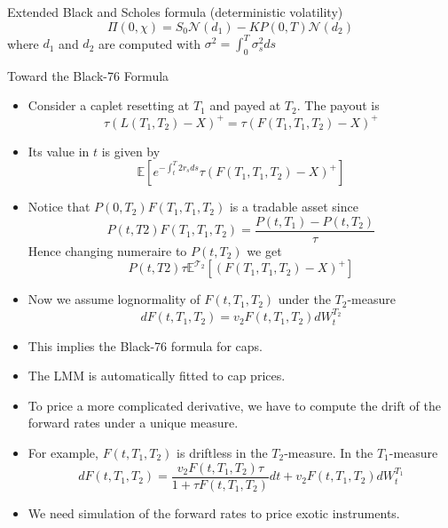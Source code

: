 \documentclass{beamer}
\begin{document}
\begin{frame}
	\begin{block}{Extended Black and Scholes formula (deterministic volatility)}
		\begin{equation}
			\Pi(0,\chi) = S_0\mathcal{N}(d_1) - KP(0,T)\mathcal{N}(d_2)
		\end{equation}
		where $d_1$ and $d_2$ are computed with $\sigma^2 = \int_0^T \sigma_s^2 ds$
	\end{block}
\end{frame}

\begin{frame}{Toward the Black-76 Formula}
	\begin{itemize}
		\item Consider a caplet resetting at $T_1$ and payed at $T_2$. The payout is 
		\begin{equation}
			\tau(L(T_1,T_2)-X)^+ = \tau(F(T_1,T_1,T_2)-X)^+
		\end{equation}
		\item Its value in $t$ is given by
		\begin{equation}
			\mathbb{E}\left[e^{-\int_t^T2r_s ds}\tau(F(T_1,T_1,T_2)-X)^+\right]
		\end{equation}
		\item Notice that $P(0,T_2)F(T_1,T_1,T_2)$ is a tradable asset since
		\begin{equation}
			P(t,T2)F(T_1,T_1,T_2)=\frac{P(t,T_1)-P(t,T_2)}{\tau}
		\end{equation}
		Hence changing numeraire to $P(t,T_2)$ we get
		\begin{equation}
			P(t,T2)\tau \mathbb{E}^{\mathcal{T_2}}\left[(F(T_1,T_1,T_2)-X)^+\right]
		\end{equation}
		\item Now we assume lognormality of $F(t,T_1,T_2)$ under the $T_2$-measure
		\begin{equation}
			dF(t,T_1,T_2)=v_2F(t,T_1,T_2) dW^{T_2}_t
		\end{equation}
	\end{itemize}
\end{frame}


\begin{frame}
	\begin{itemize}
		\item This implies the Black-76 formula for caps.
		\item The LMM is automatically fitted to cap prices.
		\item To price a more complicated derivative, we have to compute the drift of the forward rates under a unique measure.
		\item For example, $F(t,T_1,T_2)$ is driftless in the $T_2$-measure. In the $T_1$-measure
		\begin{equation}
			dF(t,T_1,T_2)=\frac{v_2F(t,T_1,T_2)\tau}{1+\tau F(t,T_1,T_2)}dt + v_2F(t,T_1,T_2)dW^{T_1}_t
		\end{equation}
		\item We need simulation of the forward rates to price exotic instruments.
	\end{itemize}
\end{frame}
\end{document}
